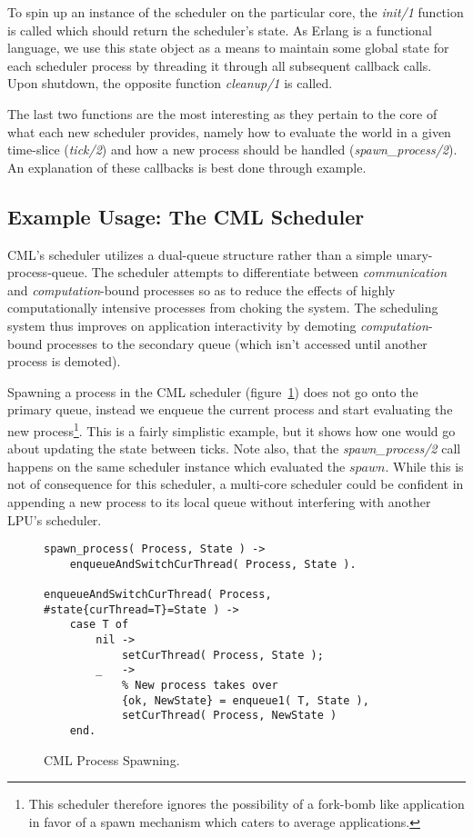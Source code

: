 To spin up an instance of the scheduler on the particular core, the 
\emph{init/1} function is called which should return the scheduler's state. 
As Erlang is a functional language, we use this state object as a means to
maintain some global state for each scheduler process by threading it through
all subsequent callback calls. Upon shutdown, the opposite function 
\emph{cleanup/1} is called.

The last two functions are the most interesting as they pertain to the core of
what each new scheduler provides, namely how to evaluate the world in a given
time-slice (\emph{tick/2}) and how a new process should be handled 
(\emph{spawn\_process/2}). An explanation of these callbacks is best done 
through example.

\subsection{Example Usage: The CML Scheduler}\label{sec:example the cml scheduler}

CML's scheduler utilizes a dual-queue structure rather than
a simple unary-process-queue. The scheduler attempts to differentiate between
{\em communication} and {\em computation}-bound processes so as to reduce the
effects of highly computationally intensive processes from choking the system.
The scheduling system thus improves on application interactivity by demoting 
{\em computation}-bound processes to the secondary queue (which isn't accessed
until another process is demoted).

Spawning a process in the CML scheduler (figure~\ref{fig:cml-spawn-process}) 
does not go onto the primary queue, instead we enqueue the current process and 
start evaluating the new process\footnote{This scheduler therefore ignores the 
possibility of a fork-bomb like application in favor of a spawn mechanism which caters 
to average applications.}. This is a fairly simplistic example, but it 
shows how one would go about updating the state between ticks. Note also, that
the \emph{spawn\_process/2} call happens on the same scheduler instance which
evaluated the $spawn$. While this is not of consequence for this scheduler, a
multi-core scheduler could be confident in appending a new process to its local
queue without interfering with another LPU's scheduler.

\begin{figure}
\begin{verbatim}
spawn_process( Process, State ) -> 
    enqueueAndSwitchCurThread( Process, State ).

enqueueAndSwitchCurThread( Process, #state{curThread=T}=State ) ->
    case T of
        nil ->
            setCurThread( Process, State );
        _   ->
            % New process takes over
            {ok, NewState} = enqueue1( T, State ), 
            setCurThread( Process, NewState )
    end.
\end{verbatim}
\caption{CML Process Spawning.}
\label{fig:cml-spawn-process}
\end{figure}

